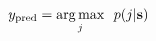 \vspace{-0.1cm}
\begin{equation}
    y_{\rm pred} = \underset{j}{\rm arg\,max} ~~ p(j|\mathbf{s})
    \label{eq:prediction}
    \vspace{-0.05cm}
\end{equation}
